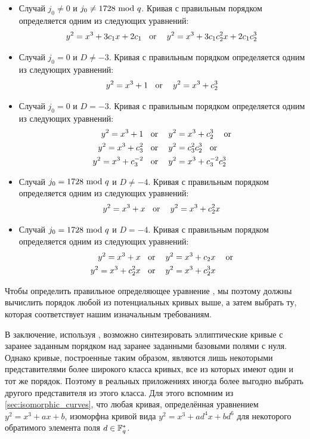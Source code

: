 \begin{itemize}
\label{def:curve-order-frobenius}
\item Случай $j_0 \neq 0 $ и $j_0\neq 1728 \text{ mod } q$. Кривая с правильным порядком определяется одним из следующих уравнений:
\begin{equation}
y^2 = x^3 + 3c_1x + 2c_1 \text{\;\; or \;\; } y^2 = x^3 + 3c_1c_2^2x + 2c_1c_2^3
\end{equation}
\item Случай $j_0 = 0 $ и $D\neq -3$. Кривая с правильным порядком определяется одним из следующих уравнений:
\begin{equation}
y^2 = x^3 + 1 \text{\;\; or \;\; } y^2 = x^3 + c_2^3
\end{equation}
\item Случай $j_0 = 0 $ и $D= -3$. Кривая с правильным порядком определяется одним из следующих уравнений:
\begin{align*}
y^2 = x^3 +1 & \text{\;\; or \;\; } y^2 = x^3 + c_2^3 \text{ \;\; or}\\  
y^2 = x^3 + c_3^2 & \text{\;\; or \;\; } y^2 = c_3^2 c_2^3 \text{\;\; or}\\
y^2 = x^3 + c_3^{-2} & \text{\;\; or \;\; }  y^2 = x^3 + c_3^{-2}c_2^3 
\end{align*}
\item Случай $j_0 = 1728 \text{ mod } q $ и $D\neq -4$. Кривая с правильным порядком определяется одним из следующих уравнений:
\begin{equation}
y^2 = x^3 + x \text{\;\; or \;\; } y^2 = x^3 + c_2^2x
\end{equation}
\item Случай $j_0 = 1728 \text{ mod } q $ и $D= -4$. Кривая с правильным порядком определяется одним из следующих уравнений:
\begin{align*}
y^2 = x^3 +x & \text{\;\; or \;\; } y^2 = x^3 + c_2x \text{ \;\; or}\\  
y^2 = x^3 + c_2^2x & \text{\;\; or \;\; } y^2 = x^3 + c_2^3x
\end{align*}
\end{itemize} 

Чтобы определить правильное определяющее уравнение , мы поэтому должны вычислить порядок любой из потенциальных кривых выше, а затем выбрать ту, которая соответствует нашим изначальным требованиям. 

В заключение, используя , возможно синтезировать эллиптические кривые с заранее заданным порядком над заранее заданными базовыми полями с нуля. Однако кривые, построенные таким образом, являются лишь некоторыми представителями более широкого класса кривых, все из которых имеют один и тот же порядок. Поэтому в реальных приложениях иногда более выгодно выбрать другого представителя из этого класса. Для этого вспомним из \ref{sec:isomorphic_curves}, что любая кривая, определённая уравнением  $y^2 = x^3 + ax + b$, изоморфна кривой вида $y^2 = x^3 + ad^4 x + bd^6$ для некоторого обратимого элемента поля $d\in \mathbb{F}^*_q$. 

